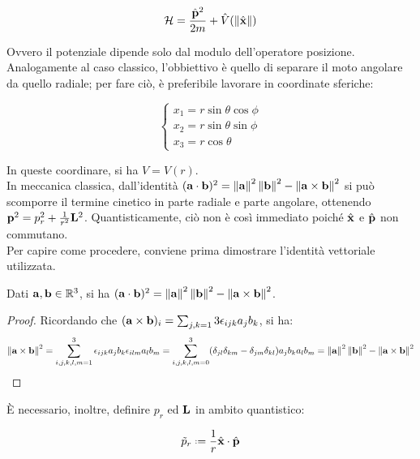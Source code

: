 \begin{equation}
	\mathcal{H} = \frac{\hat{\mathbf{p}}^2}{2m} + \hat{V}(\left\lVert\hat{\mathbf{x}}\right\rVert)
	\label{eq:27}
\end{equation}

Ovvero il potenziale dipende solo dal modulo dell'operatore posizione.\\
Analogamente al caso classico, l'obbiettivo è quello di separare il moto angolare da quello radiale; per fare ciò, è preferibile lavorare in coordinate sferiche:

\begin{equation}
	\begin{cases}
		x_1 = r \sin \theta \cos \phi \\
		x_2 = r \sin \theta \sin \phi \\
		x_3 = r \cos \theta
	\end{cases}
	\label{eq:28}
\end{equation}

In queste coordinare, si ha $ V = V(r) $.\\
In meccanica classica, dall'identità $ (\mathbf{a}\cdot\mathbf{b})^2 = \left\lVert\mathbf{a}\right\rVert^2 \left\lVert\mathbf{b}\right\rVert^2 - \left\lVert\mathbf{a}\times\mathbf{b}\right\rVert^2 $ si può scomporre il termine cinetico in parte radiale e parte angolare, ottenendo $ \mathbf{p}^2 = p_r^2 + \frac{1}{r^2}\mathbf{L}^2 $. Quantisticamente, ciò non è così immediato poiché $ \hat{\mathbf{x}} $ e $ \hat{\mathbf{p}} $ non commutano.\\
Per capire come procedere, conviene prima dimostrare l'identità vettoriale utilizzata.

\begin{proposition}
	Dati $ \mathbf{a}, \mathbf{b} \in\mathbb{R}^3 $, si ha $ (\mathbf{a}\cdot\mathbf{b})^2 = \left\lVert\mathbf{a}\right\rVert^2 \left\lVert\mathbf{b}\right\rVert^2 - \left\lVert\mathbf{a}\times\mathbf{b}\right\rVert^2 $.
\end{proposition}
\begin{proof}
	Ricordando che $ (\mathbf{a}\times\mathbf{b})_i = \sum_{j,k = 1}{3} \epsilon_{ijk} a_j b_k $, si ha:
	\begin{equation*}
		\left\lVert\mathbf{a}\times\mathbf{b}\right\rVert^2 = \sum_{i,j,k,l,m = 1}^{3} \epsilon_{ijk} a_j b_k \epsilon_{ilm} a_l b_m = \sum_{i,j,k,l,m = 0}^{3} (\delta_{jl}\delta_{km} - \delta_{jm}\delta_{kl}) a_j b_k a_l b_m = \left\lVert\mathbf{a}\right\rVert^2 \left\lVert\mathbf{b}\right\rVert^2 - \left\lVert\mathbf{a}\times\mathbf{b}\right\rVert^2
	\end{equation*}
\end{proof}

È necessario, inoltre, definire $ p_r $ ed $ \mathbf{L} $ in ambito quantistico:

\begin{equation}
	\tilde{p}_r \defeq \frac{1}{r} \hat{\ve{x}}\cdot\hat{\ve{p}}
	\label{eq:29}
\end{equation}

